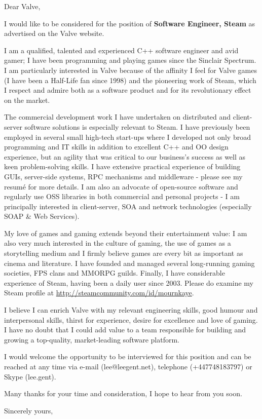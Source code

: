 \documentclass[a4paper,11pt]{letter}
\begin{document}
\begin{letter}{}
\opening{Dear Valve,}

I would like to be considered for the position of {\bf Software Engineer, Steam} as advertised on the Valve website.

I am a qualified, talented and experienced C++ software engineer and avid gamer; I have been programming and playing games since the Sinclair Spectrum.  I am particularly interested in Valve because of the affinity I feel for Valve games (I have been a Half-Life fan since 1998) and the pioneering work of Steam, which I respect and admire both as a software product and for its revolutionary effect on the market.

The commercial development work I have undertaken on distributed and client-server software solutions is especially relevant to Steam.  I have previously been employed in several small high-tech start-ups where I developed not only broad programming and IT skills in addition to excellent C++ and OO design experience, but an agility that was critical to our business's success as well as keen problem-solving skills.  I have extensive practical experience of building GUIs, server-side systems, RPC mechanisms and middleware - please see my resum\'{e} for more details.  I am also an advocate of open-source software and regularly use OSS libraries in both commercial and personal projects - I am principally interested in client-server, SOA and network technologies (especially SOAP \& Web Services).

My love of games and gaming extends beyond their entertainment value: I am also very much interested in the culture of gaming, the use of games as a storytelling medium and I firmly believe games are every bit as important as cinema and literature.  I have founded and managed several long-running gaming societies, FPS clans and MMORPG guilds.  Finally, I have considerable experience of Steam, having been a daily user since 2003.  Please do examine my Steam profile at \url{http://steamcommunity.com/id/mournkaye}.

I believe I can enrich Valve with my relevant engineering skills, good humour and interpersonal skills, thirst for experience, desire for excellence and love of gaming.  I have no doubt that I could add value to a team responsible for building and growing a top-quality, market-leading software platform.

I would welcome the opportunity to be interviewed for this position and can be reached at any time via e-mail (lee@leegent.net), telephone (+447748183797) or Skype (lee.gent).

Many thanks for your time and consideration, I hope to hear from you soon.
\closing{Sincerely yours,\\
 \\
}
\end{letter}
\end{document}
